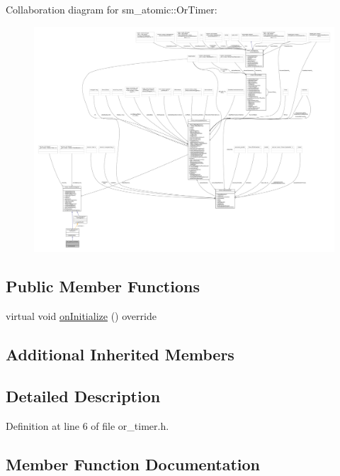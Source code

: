 Collaboration diagram for sm\+\_\+atomic\+:\+:Or\+Timer\+:
\nopagebreak
\begin{figure}[H]
\begin{center}
\leavevmode
\includegraphics[width=350pt]{classsm__atomic_1_1OrTimer__coll__graph}
\end{center}
\end{figure}
\subsection*{Public Member Functions}
\begin{DoxyCompactItemize}
\item 
virtual void \hyperlink{classsm__atomic_1_1OrTimer_a509b0d9ce7c6ed9e0c291decaf6dd280}{on\+Initialize} () override
\end{DoxyCompactItemize}
\subsection*{Additional Inherited Members}


\subsection{Detailed Description}


Definition at line 6 of file or\+\_\+timer.\+h.



\subsection{Member Function Documentation}
\mbox{\label{classsm__atomic_1_1OrTimer_a509b0d9ce7c6ed9e0c291decaf6dd280}} 
